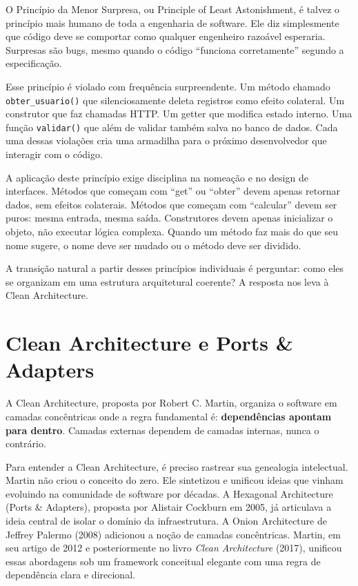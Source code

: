 O Princípio da Menor Surpresa, ou Principle of Least Astonishment, é talvez
o princípio mais humano de toda a engenharia de software. Ele diz simplesmente
que código deve se comportar como qualquer engenheiro razoável esperaria.
Surpresas são bugs, mesmo quando o código ``funciona corretamente'' segundo
a especificação.

Esse princípio é violado com frequência surpreendente. Um método chamado
\texttt{obter\_usuario()} que silenciosamente deleta registros como efeito
colateral. Um construtor que faz chamadas HTTP. Um getter que modifica estado
interno. Uma função \texttt{validar()} que além de validar também salva no
banco de dados. Cada uma dessas violações cria uma armadilha para o próximo
desenvolvedor que interagir com o código.

A aplicação deste princípio exige disciplina na nomeação e no design
de interfaces. Métodos que começam com ``get'' ou ``obter'' devem apenas
retornar dados, sem efeitos colaterais. Métodos que começam com ``calcular''
devem ser puros: mesma entrada, mesma saída. Construtores devem apenas
inicializar o objeto, não executar lógica complexa. Quando um método faz mais
do que seu nome sugere, o nome deve ser mudado ou o método deve ser dividido.

A transição natural a partir desses princípios individuais é perguntar: como
eles se organizam em uma estrutura arquitetural coerente? A resposta nos leva
à Clean Architecture.


\section{Clean Architecture e Ports \& Adapters}

A Clean Architecture, proposta por Robert C. Martin, organiza o software em camadas
concêntricas onde a regra fundamental é: \textbf{dependências apontam para dentro}.
Camadas externas dependem de camadas internas, nunca o contrário.

Para entender a Clean Architecture, é preciso rastrear sua
genealogia intelectual. Martin não criou o conceito do zero. Ele sintetizou e
unificou ideias que vinham evoluindo na comunidade de software por décadas. A
Hexagonal Architecture (Ports \& Adapters), proposta por Alistair Cockburn em
2005, já articulava a ideia central de isolar o domínio da infraestrutura. A
Onion Architecture de Jeffrey Palermo (2008) adicionou a noção de camadas
concêntricas. Martin, em seu artigo de 2012 e posteriormente no livro
\emph{Clean Architecture} (2017), unificou essas abordagens sob um framework
conceitual elegante com uma regra de dependência clara e direcional.

